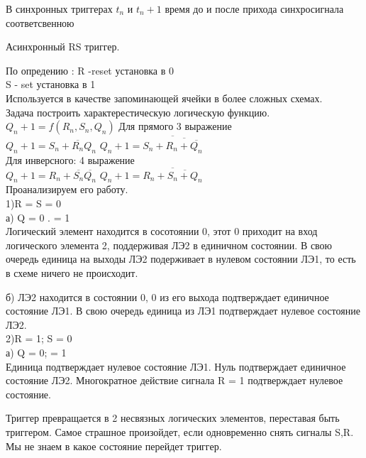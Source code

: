 В синхронных триггерах $t_n$ и $t_n+1$ время до и после прихода синхросигнала соответсвенною

Асинхронный RS триггер.

По опредению :
R -reset установка в 0 \\
S - set  установка в 1 \\

Используется в качестве запоминающей ячейки в более сложных схемах.\\
Задача построить характерестическую логическую функцию.\\
$Q_n+1 = f(R_n , S_n, Q_n)$
Для прямого  3 выражение\\
$Q_n+1 = S_n + \overline{R_n} Q_n$
$Q_n+1 = \overline {S_n + \overline{R_n + \overline{Q_n}}} $\\

Для инверсного:  4  выражение\\
$Q_n+1 = R_n + \overline{S_n} \overline{ Q_n}$
$Q_n+1 = \overline {R_n + \overline{S_n + Q_n}} $\\

Проанализируем его работу.\\

1)R = S = 0\\
а) Q = 0 .  = 1\\
Логический элемент находится в сосотоянии 0, этот 0 приходит на вход логического элемента 2, поддерживая ЛЭ2 в единичном состоянии.
В свою очередь единица на выходы ЛЭ2 подерживает в нулевом состоянии ЛЭ1, то есть в схеме ничего не происходит.

б)
ЛЭ2 находится в состоянии 0, 0 из его выхода подтверждает единичное состояние ЛЭ1.
В свою очередь единица из ЛЭ1 подтверждает нулевое состояние ЛЭ2.\\


2)R = 1; S = 0\\
а) Q = 0;   = 1 \\
Единица подтверждает нулевое состояние ЛЭ1. Нуль подтверждает единичное состояние ЛЭ2.
Многократное действие сигнала R = 1 подтверждает нулевое состояние.

Триггер превращается в 2 несвязных логических элементов, переставая быть триггером.
Самое страшное произойдет, если одновременно снять сигналы S,R. Мы не знаем в какое состояние перейдет триггер.


